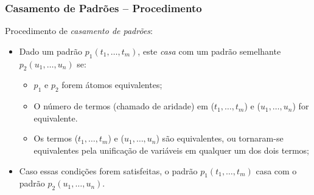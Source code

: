 \begin{frame}[fragile]
\frametitle{Casamento de Padrões -- Procedimento}


Procedimento de {\em casamento de padrões}:

\begin{itemize}
	\item Dado um padrão $p_1(t_1, \ldots,t_m)$, este \emph{casa} 
	com um padrão semelhante $p_2(u_1, \ldots,u_n)$ se:
    
    \begin{itemize}
    	\item $p_1$ e $p_2$ forem átomos equivalentes;
    
        \item O número de termos (chamado de aridade) em ($t_1, \ldots,t_m$)
        e ($u_1, \ldots,u_n$) for equivalente.
    
    	\item Os termos ($t_1, \ldots,t_m$) e ($u_1, \ldots,u_n$) são equivalentes, ou tornaram-se  equivalentes pela unificação de variáveis	em qualquer um dos dois termos;
    \end{itemize}
    
    \item Caso essas condições forem satisfeitas, o padrão $p_1(t_1,\ldots,t_m)$  casa com o padrão $p_2(u_1, \ldots,u_n)$.
    
\end{itemize}        

\end{frame}


